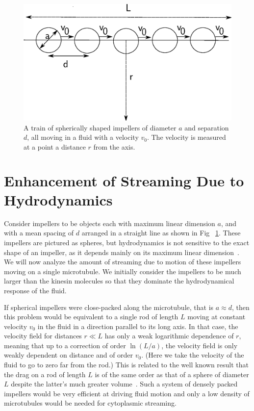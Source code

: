 \documentclass[pre,showpacs]{revtex4}
\begin{document}
\begin{figure}[htp]
\begin{center}
\includegraphics[width=\hsize]{spheres.eps}
\caption{ 
A train of spherically shaped impellers of diameter $a$ and separation $d$, all moving in a fluid with a velocity $v_0$.
The velocity is measured at a point a distance $r$ from the axis.
}
\label{fig:spheres}
\end{center}
\end{figure}

\section{Enhancement of Streaming Due to Hydrodynamics} 

Consider impellers to be objects each with maximum linear dimension
$a$, and with a mean spacing of $d$ arranged in a straight line as shown in Fig ~\ref{fig:spheres}. 
These impellers are pictured as spheres, but hydrodynamics is not sensitive to
the exact shape of an impeller, as it depends mainly on its maximum linear dimension~\cite{BergRandomWalksinBiology}. 
We will
now analyze the amount of streaming due to motion of these impellers
moving on a single microtubule. We initially consider the impellers to be much larger than
the kinesin molecules so that they dominate the hydrodynamical response
of the fluid.

If spherical impellers were close-packed along the microtubule, that is $a \approx
d$, then this problem would be equivalent to a single rod of length $L$
moving at constant velocity $v_0$ in the fluid in a direction parallel
to its long axis.  In that case, the velocity field for distances
$r \ll L$ has only a weak logarithmic dependence of $r$, meaning that up
to a correction of order $\ln(L/a)$, the velocity field is only weakly
dependent on distance and of order $v_0$. (Here we take the velocity of the fluid
to go to zero far from the rod.)
This is related to the well
known result that the drag on a rod of length $L$ is of the same order
as that of a sphere of diameter $L$ despite the latter's much greater volume~\cite{BergRandomWalksinBiology}. Such a system of densely packed impellers would
be very efficient at driving fluid motion and only a low density of microtubules
would be needed for cytoplasmic streaming.
\end{document}
